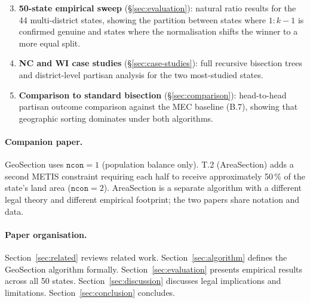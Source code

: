 \begin{enumerate}\setcounter{enumi}{2}
\item \textbf{50-state empirical sweep} (\S\ref{sec:evaluation}): natural ratio
  results for the 44 multi-district states, showing the partition between
  states where $1:k-1$ is confirmed genuine and states where the
  normalisation shifts the winner to a more equal split.

\item \textbf{NC and WI case studies} (\S\ref{sec:case-studies}): full
  recursive bisection trees and district-level partisan analysis for the two
  most-studied states.

\item \textbf{Comparison to standard bisection} (\S\ref{sec:comparison}):
  head-to-head partisan outcome comparison against the MEC baseline (B.7),
  showing that geographic sorting dominates under both algorithms.
\end{enumerate}

\paragraph{Companion paper.}
GeoSection uses $\mathtt{ncon}=1$ (population balance only).
T.2 (AreaSection) adds a second METIS constraint requiring each half to
receive approximately 50\,\% of the state's land area ($\mathtt{ncon}=2$).
AreaSection is a separate algorithm with a different legal theory and
different empirical footprint; the two papers share notation and data.

\paragraph{Paper organisation.}
Section~\ref{sec:related} reviews related work.
Section~\ref{sec:algorithm} defines the GeoSection algorithm formally.
Section~\ref{sec:evaluation} presents empirical results across all 50 states.
Section~\ref{sec:discussion} discusses legal implications and limitations.
Section~\ref{sec:conclusion} concludes.

